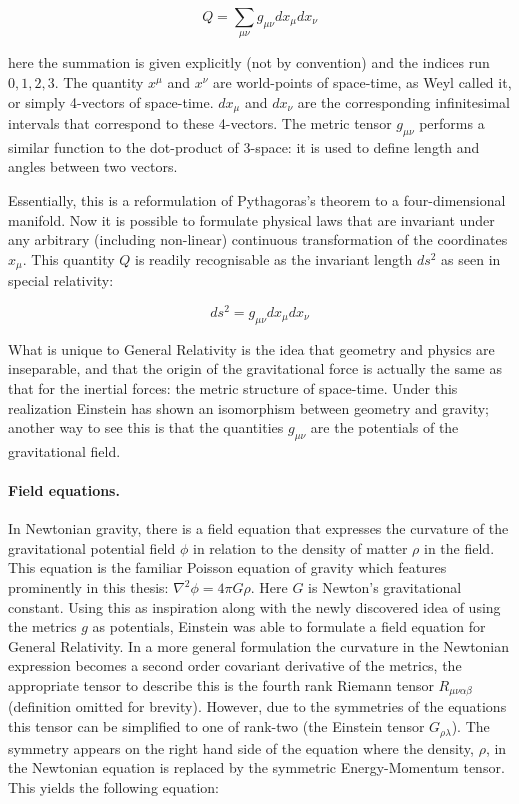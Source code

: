 \begin{equation}
\label{eqn_metricform}
Q = \sum_{\mu \nu} g_{\mu \nu} dx_{\mu} dx_{\nu}
\end{equation}

\noindent here the summation is given explicitly (not by convention) and the indices run $0, 1, 2, 3$. The quantity $x^{\mu}$ and $x^{\nu}$ are world-points of space-time, as Weyl called it, or simply 4-vectors of space-time. $dx_{\mu}$ and $dx_{\nu}$ are the corresponding infinitesimal intervals that correspond to these 4-vectors. The metric tensor $g_{\mu \nu}$ performs a similar function to the dot-product of 3-space: it is used to define length and angles between two vectors.

Essentially, this is a reformulation of Pythagoras's theorem to a four-dimensional manifold. Now it is possible to formulate physical laws that are invariant under any arbitrary (including non-linear) continuous transformation of the coordinates $x_{\mu}$. This quantity $Q$ is readily recognisable as the invariant length $ds^2$ as seen in special relativity:

\begin{equation}
\label{eqn_metric1}
ds^2 = g_{\mu \nu} dx_{\mu} dx_{\nu}
\end{equation}

\noindent What is unique to General Relativity is the idea that geometry and physics are inseparable, and that the origin of the gravitational force is actually the same as that for the inertial forces: the metric structure of space-time. Under this realization Einstein has shown an isomorphism between geometry and gravity; another way to see this is that the quantities $g_{\mu\nu}$ are the potentials of the gravitational field.

\paragraph{Field equations.} In Newtonian gravity, there is a field equation that expresses the curvature of the gravitational potential field $\phi$ in relation to the density of matter $\rho$ in the field. This equation is the familiar Poisson equation of gravity which features prominently in this thesis: $\nabla^2 \phi = 4\pi G \rho$. Here $G$ is Newton's gravitational constant. Using this as inspiration along with the newly discovered idea of using the metrics $g$ as potentials, Einstein was able to formulate a field equation for General Relativity. In a more general formulation the curvature in the Newtonian expression becomes a second order covariant derivative of the metrics, the appropriate tensor to describe this is the fourth rank Riemann tensor $R_{\mu\nu\alpha\beta}$ (definition omitted for brevity). However, due to the symmetries of the equations this tensor can be simplified to one of rank-two (the Einstein tensor $G_{\rho\lambda}$). The symmetry appears on the right hand side of the equation where the density, $\rho$, in the Newtonian equation is replaced by the symmetric Energy-Momentum tensor. This yields the following equation:

